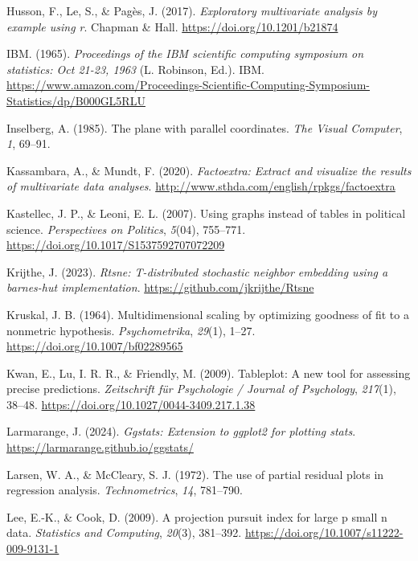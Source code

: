 \documentclass[
  letterpaper,
  10pt,
  krantz2]{krantz}
\newlength{\cslhangindent}
\newenvironment{CSLReferences}[2] %
 {\begin{list}{}{%
  \setlength{\itemindent}{0pt}
  \setlength{\leftmargin}{0pt}
  \setlength{\parsep}{0pt}
  \ifodd #1
   \setlength{\leftmargin}{\cslhangindent}
   \setlength{\itemindent}{-1\cslhangindent}
  \fi
  \setlength{\itemsep}{#2\baselineskip}}}
 {\end{list}}
\begin{document}
\begin{CSLReferences}{1}{0}
Husson, F., Le, S., \& Pagès, J. (2017). \emph{Exploratory multivariate
analysis by example using r}. Chapman \& Hall.
\url{https://doi.org/10.1201/b21874}

IBM. (1965). \emph{Proceedings of the IBM scientific computing symposium
on statistics: Oct 21-23, 1963} (L. Robinson, Ed.). IBM.
\url{https://www.amazon.com/Proceedings-Scientific-Computing-Symposium-Statistics/dp/B000GL5RLU}

Inselberg, A. (1985). The plane with parallel coordinates. \emph{The
Visual Computer}, \emph{1}, 69--91.

Kassambara, A., \& Mundt, F. (2020). \emph{Factoextra: Extract and
visualize the results of multivariate data analyses}.
\url{http://www.sthda.com/english/rpkgs/factoextra}

Kastellec, J. P., \& Leoni, E. L. (2007). Using graphs instead of tables
in political science. \emph{Perspectives on Politics}, \emph{5}(04),
755--771. \url{https://doi.org/10.1017/S1537592707072209}

Krijthe, J. (2023). \emph{Rtsne: T-distributed stochastic neighbor
embedding using a barnes-hut implementation}.
\url{https://github.com/jkrijthe/Rtsne}

Kruskal, J. B. (1964). Multidimensional scaling by optimizing goodness
of fit to a nonmetric hypothesis. \emph{Psychometrika}, \emph{29}(1),
1--27. \url{https://doi.org/10.1007/bf02289565}

Kwan, E., Lu, I. R. R., \& Friendly, M. (2009). Tableplot: A new tool
for assessing precise predictions. \emph{Zeitschrift f{ü}r Psychologie /
Journal of Psychology}, \emph{217}(1), 38--48.
\url{https://doi.org/10.1027/0044-3409.217.1.38}

Larmarange, J. (2024). \emph{Ggstats: Extension to ggplot2 for plotting
stats}. \url{https://larmarange.github.io/ggstats/}

Larsen, W. A., \& McCleary, S. J. (1972). The use of partial residual
plots in regression analysis. \emph{Technometrics}, \emph{14}, 781--790.

Lee, E.-K., \& Cook, D. (2009). A projection pursuit index for large p
small n data. \emph{Statistics and Computing}, \emph{20}(3), 381--392.
\url{https://doi.org/10.1007/s11222-009-9131-1}


\end{CSLReferences}
\end{document}
